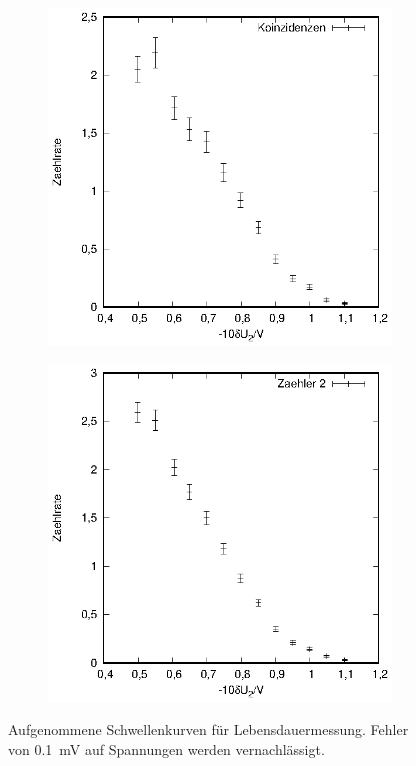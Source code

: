 \begin{figure}[h]
\begin{subfigure}[h]{0.5\textwidth}
  \end{subfigure}
  \begin{subfigure}[h]{0.5\textwidth}
    \centering
    \includegraphics[width=\textwidth]{data/schwelle_2_koinzidenz.eps}
  \end{subfigure}%
  \begin{subfigure}[h]{0.5\textwidth}
    \centering
    \includegraphics[width=\textwidth]{data/schwelle_2_zaehler.eps}
  \end{subfigure}
  \caption{Aufgenommene Schwellenkurven für Lebensdauermessung. Fehler von \SI{0.1}{\milli\volt} auf Spannungen werden vernachlässigt.}
  \label{fig:schwelle_lebensdauer}
\end{figure} 
